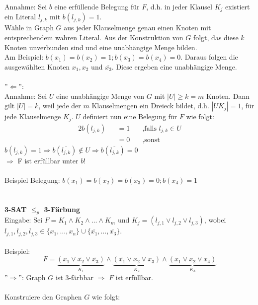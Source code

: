 \documentclass{article} %
\begin{document}
Annahme: Sei $b$ eine erfüllende Belegung für $F$, d.h. in jeder Klausel $K_j$ existiert ein Literal $l_{j,k}$ mit $b(l_{j,k}) = 1$.\\
Wähle in Graph $G$ aus jeder Klauselmenge genau einen Knoten mit entsprechendem wahren Literal. Aus der Konstruktion von $G$ folgt, das diese $k$ Knoten unverbunden sind und eine unabhängige Menge bilden.\\
Am Beispiel: $b(x_1) = b(x_2) = 1; b(x_3) = b(x_4) = 0$. Daraus folgen die ausgewählten Knoten $x_1, x_2$ und $\overline{x_3}$. Diese ergeben eine unabhängige Menge.\\
\\
''$\Leftarrow$'':\\
Annahme: Sei $U$ eine unabhängige Menge von $G$ mit $|U| \geq k = m$ Knoten. Dann gilt $|U| = k$, weil jede der $m$ Klauselmengen ein Dreieck bildet, d.h. $|U  K_j| = 1$, für jede Klauselmenge $K_j$. $U$ definiert nun eine Belegung für $F$ wie folgt:
\begin{alignat*}{2}
b(l_{j,k}) &&= 1	&\quad\text{,falls } l_{j,k} \in U\\
			&&=0	&\quad\text{,sonst}
\end{alignat*}
$b(l_{j,k}) = 1 \Rightarrow b(\overline{l_{j,k}}) \notin U \Rightarrow b(\overline{l_{j,k}}) = 0$\\
$\Rightarrow$ F ist erfüllbar unter $b$!\\
\\
Beispiel Belegung: $b(x_1) = b(x_2) = b(x_3) = 0; b(x_4) = 1$\\
\\
\\
\textbf{3-SAT $\leq_p$ 3-Färbung}\\
Eingabe: Sei $F = K_1 \wedge K_2 \wedge \ldots \wedge K_m$ und $K_j = (l_{j,1} \vee l_{j,2} \vee l_{j,3})$, wobei
$l_{j,1}, l_{j,2}, l_{j,3} \in \{x_1, \ldots, x_n\} \cup \{\overline{x_1}, \ldots, \overline{x_3}\}$.\\
\\
Beispiel: \[F = \underbrace{(x_1 \vee \overline{x_2} \vee \overline{x_3})}_{K_1} \wedge \underbrace{(\overline{x_1} \vee x_2 \vee x_3)}_{K_2} \wedge \underbrace{(x_1 \vee x_2 \vee x_4)}_{K_3}\]
''$\Rightarrow$'': Graph $G$ ist 3-färbbar $\Rightarrow$ $F$ ist erfüllbar.\\
\\
Konstruiere den Graphen $G$ wie folgt:
\end{document}
